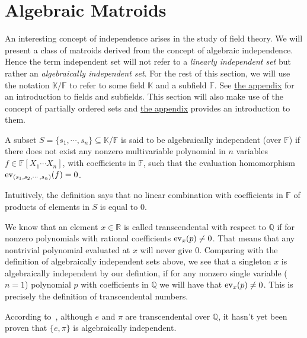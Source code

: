 \newpage

\section{Algebraic Matroids}\label{sec:algebraic-matroids}

An interesting concept of independence arises in the study of field theory.  We will present a class of matroids derived from the concept of algebraic independence. Hence the term independent set will not refer to a \textit{linearly independent set} but rather an \textit{algebraically independent set}. For the rest of this section, we will use the notation $\mathbb K / \mathbb F$ to refer to some field $\mathbb K$ and a subfield $\mathbb F$. See \hyperref[sec:appendix-fields]{the appendix} for an introduction to fields and subfields. This section will also make use of the concept of partially ordered sets and  \hyperref[sec:appendix-poset]{the appendix} provides an introduction to them.

\begin{defn}
	A subset $S = \{ s_1 ,\cdots, s _n \} \subseteq \mathbb K / \mathbb F$ is said to be algebraically independent (over $\mathbb F$) if there does not exist any
	nonzero multivariable polynomial in $n$ variables $f \in \mathbb{F}[X _1 \cdots X _n]$, with coefficients in $\mathbb{F} $, such that the evaluation homomorphism $\mathrm{ev}_{(s_1, s_2,\cdots,s_n)}(f) = 0$.
\end{defn}
Intuitively, the definition says that no linear combination with coefficients in $\mathbb F$ of products of elements in $S$ is equal to $0$.

We know that an element $x\in \mathbb{R}$ is called transcendental with respect to $\mathbb{Q}$ if for nonzero polynomials with rational coefficients $\mathrm{ev}_{x}(p) \neq 0$. That means that any nontrivial polynomial evaluated at $x$ will never give 0.
Comparing with the definition of algebraically independent sets above, we see that a singleton ${x}$ is algebraically independent by our defintion, if for any nonzero  single variable ($n = 1$) polynomial $p$ with coefficients in $\mathbb{Q}$ we will have that $\mathrm{ev}_{x}(p) \neq 0$. This is precisely the definition of transcendental numbers.

\begin{exmp}
According to~\cite[113]{milne2022}, although $e$ and $\pi$ are transcendental over $\mathbb{Q}$, it hasn't yet been proven that $\{e, \pi \}$ is algebraically independent.
\end{exmp}

